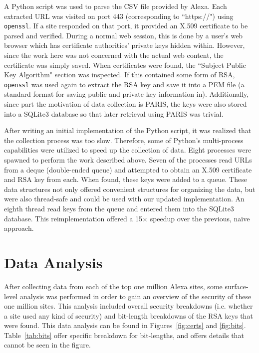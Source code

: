\documentclass[12pt]{ucthesis}
\begin{document}
A Python script was used to parse the CSV file provided by Alexa. Each
extracted URL was visited on port 443 (corresponding to ``https://") using 
\texttt{openssl}. If a site responded on that port, it provided an X.509
certificate to be parsed and verified. During a normal web session, this is
done by a user's web browser which has certificate authorities' private keys
hidden within. However, since the work here was not concerned with the actual
web content, the certificate was simply saved. When certificates were found,
the ``Subject Public Key Algorithm" section was inspected. If this contained
some form of RSA, \texttt{openssl} was used again to extract the RSA key and
save it into a PEM file (a standard format for saving public and private key
information in). Additionally, since part the motivation of data collection is
PARIS, the keys were also stored into a SQLite3 database so that later
retrieval using PARIS was trivial.  

After writing an initial implementation of the Python script, it was realized
that the collection process was too slow. Therefore, some of Python's
multi-process capabilities were utilized to speed up the collection of data.
Eight processes were spawned to perform the work described above. Seven of the
processes read URLs from a deque (double-ended queue) and attempted to obtain
an X.509 certificate and RSA key from each. When found, these keys were added
to a queue. These data structures not only offered convenient structures for
organizing the data, but were also thread-safe and could be used with our
updated implementation. An eighth thread read keys from the queue and entered
them into the SQLite3 database. This reimplementation offered a 15$\times$
speedup over the previous, na\"{i}ve approach.

\section{Data Analysis}
\label{subsec:datanalysis}
After collecting data from each of the top one million Alexa sites, some
surface-level analysis was performed in order to gain an overview of the
security of these one million sites. This analysis included overall security
breakdowns (i.e. whether a site used any kind of security) and
bit-length breakdowns of the RSA keys that were found. This data analysis can
be found in Figures~\ref{fig:certs} and \ref{fig:bits}. Table~\ref{tab:bits}
offer specific breakdown for bit-lengths, and offers details that cannot be
seen in the figure.
\end{document}
